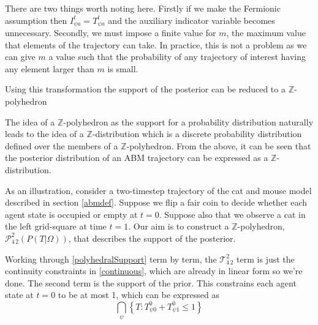 \documentclass{article}
\begin{document}
There are two things worth noting here. Firstly if we make the Fermionic assumption then $I^t_{\psi a} = T^t_{\psi a}$ and the auxiliary indicator variable becomes unnecessary. Secondly, we must impose a finite value for $m$, the maximum value that elements of the trajectory can take. In practice, this is not a problem as we can give $m$ a value such that the probability of any trajectory of interest having any element larger than $m$ is small.

Using this transformation the support of the posterior can be reduced to a $\mathbb{Z}$-polyhedron

The idea of a $\mathbb{Z}$-polyhedron as the support for a probability distribution naturally leads to the idea of a $\mathbb{Z}$-distribution which is a discrete probability distribution defined over the members of a $\mathbb{Z}$-polyhedron. From the above, it can be seen that the posterior distribution of an ABM trajectory can be expressed as a $\mathbb{Z}$-distribution.

As an illustration, consider a two-timestep trajectory of the cat and mouse model described in section \ref{abmdef}. Suppose we flip a fair coin to decide whether each agent state is occupied or empty at $t=0$. Suppose also that we observe a cat in the left grid-square at time $t=1$. Our aim is to construct a $\mathbb{Z}$-polyhedron, $\mathcal{P}^2_{4\,2}(P(T|\Omega))$, that describes the support of the posterior.

Working through \eqref{polyhedralSupport} term by term, the $\mathcal{T}^2_{4\,2}$ term is just the continuity constraints in \eqref{continuous}, which are already in linear form so we're done. The second term is the support of the prior. This constrains each agent state at $t=0$ to be at most 1, which can be expressed as
\[
\bigcap_\psi \left\{T:T^0_{\psi 0} + T^0_{\psi 1} \le 1\right\}
\]
\end{document}

